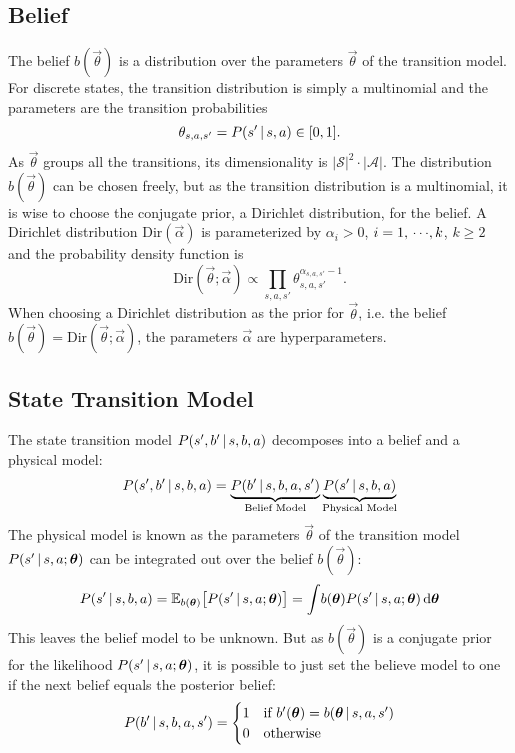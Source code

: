		\subsection{Belief}
			The belief \(b(\vec{\theta})\) is a distribution over the parameters \(\vec{\theta}\) of the transition model. For discrete states, the transition distribution is simply a multinomial and the parameters are the transition probabilities
			\begin{equation*}
				\theta_{s, a, s'} = P(s' \,\vert\, s, a) \in [0, 1].
			\end{equation*}
			As \(\vec{\theta}\) groups all the transitions, its dimensionality is \( \lvert \mathcal{S} \rvert^2 \cdot \lvert \mathcal{A} \rvert \). The distribution \( b(\vec{\theta}) \) can be chosen freely, but as the transition distribution is a multinomial, it is wise to choose the conjugate prior, a Dirichlet distribution, for the belief. A Dirichlet distribution \( \mathrm{Dir}(\vec{\alpha}) \) is parameterized by \( \alpha_i > 0 \), \( i = 1,\,\cdots\!,k \), \( k \geq 2 \) and the probability density function is
			\begin{equation*}
				\mathrm{Dir}(\vec{\theta}; \vec{\alpha}) \propto \prod_{s, a, s'} \theta_{s, a, s'}^{\alpha_{s, a, s'} - 1}.
			\end{equation*}
			When choosing a Dirichlet distribution as the prior for \( \vec{\theta} \), i.e. the belief \( b(\vec{\theta}) = \mathrm{Dir}(\vec{\theta}; \vec{\alpha}) \), the parameters \( \vec{\alpha} \) are hyperparameters.

		\subsection{State Transition Model}
			The state transition model \( P(s', b' \,\vert\, s, b, a) \) decomposes into a belief and a physical model:
			\begin{equation*}
				P(s', b' \,\vert\, s, b, a) = \underbrace{P(b' \,\vert\, s, b, a, s')}_\text{Belief Model} \underbrace{P(s' \,\vert\, s, b, a)}_\text{Physical Model}
			\end{equation*}
			The physical model is known as the parameters \(\vec{\theta}\) of the transition model \( P(s' \,\vert\, s, a; \bm{\theta}) \) can be integrated out over the belief \( b(\vec{\theta}) \):
			\begin{equation*}
				P(s' \,\vert\, s, b, a) = \mathbb{E}_{b(\bm{\theta})}\big[ P(s' \,\vert\, s, a; \bm{\theta}) \big] = \int\! b(\bm{\theta}) P(s' \,\vert\, s, a; \bm{\theta}) \dd{\bm{\theta}}
			\end{equation*}
			This leaves the belief model to be unknown. But as \(b(\vec{\theta})\) is a conjugate prior for the likelihood \( P(s' \,\vert\, s, a; \bm{\theta}) \), it is possible to just set the believe model to one if the next belief equals the posterior belief:
			\begin{equation*}
				P(b' \,\vert\, s, b, a, s') =
					\begin{cases}
						1 & \text{if } b'(\bm{\theta}) = b(\bm{\theta} \,\vert\, s, a, s') \\
						0 & \text{otherwise}
					\end{cases}
			\end{equation*}


